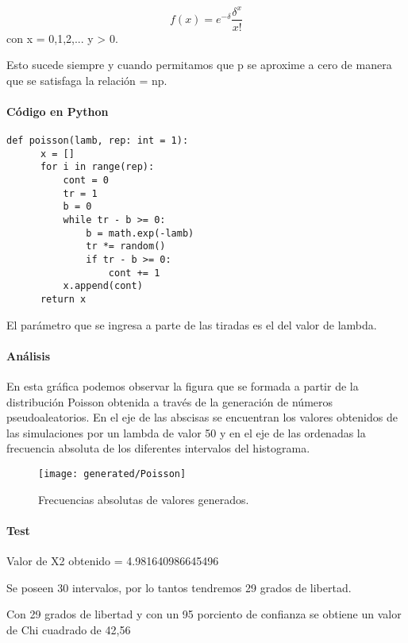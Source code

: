 \documentclass{article}
\begin{document}
  \begin{equation}
    f(x) = e^{-\delta}\frac{\delta^x}{x!}
    \end{equation}
  con x = 0,1,2,... y \delta > 0.

  Esto sucede siempre y cuando permitamos que p se aproxime a cero de manera que se satisfaga la relación \delta = np.


  \paragraph{Código en Python}
  \begin{lstlisting}[style = Python]
    def poisson(lamb, rep: int = 1):
      x = []
      for i in range(rep):
          cont = 0
          tr = 1
          b = 0
          while tr - b >= 0:
              b = math.exp(-lamb)
              tr *= random()
              if tr - b >= 0:
                  cont += 1
          x.append(cont)
      return x
  \end{lstlisting}
  El parámetro que se ingresa a parte de las tiradas es el del valor de lambda.

  \paragraph{Análisis\newline}
  En esta gráfica podemos observar la figura que se formada a partir de la distribución Poisson obtenida a través de
  la generación de números pseudoaleatorios. En el eje de las abscisas se  encuentran los valores obtenidos de las simulaciones
  por un lambda de valor 50 y en el eje de las ordenadas la frecuencia absoluta de los diferentes intervalos del histograma.
  \begin{figure}[h]
  \centering
  \texttt{[image: generated/Poisson]}
  \caption{Frecuencias absolutas de valores generados.}
  \end{figure}


  \paragraph{Test\newline}

    Valor de X2 obtenido = 4.981640986645496

    Se poseen 30 intervalos, por lo tantos tendremos 29 grados de libertad.

    Con 29 grados de libertad y con un 95 porciento de confianza se obtiene un valor de Chi cuadrado de 42,56
\end{document}
